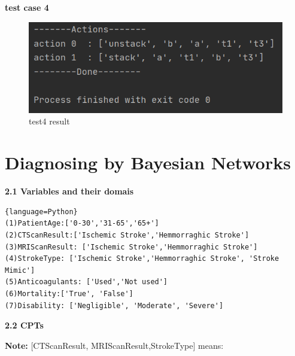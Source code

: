 \documentclass[a4paper, 11pt]{article}
\begin{document}
\begin{enumerate}
	\textbf{test case 4}
	\begin{figure}[H]
	\centering
	\includegraphics[width=1\textwidth]{Pic/test4.png}
	\caption{test4 result}
	\end{figure}
		
\end{enumerate}


\section{Diagnosing by Bayesian Networks}
\textbf{2.1 Variables and their domais}
\begin{lstlisting}{language=Python}
(1)PatientAge:['0-30','31-65','65+']
(2)CTScanResult:['Ischemic Stroke','Hemmorraghic Stroke']
(3)MRIScanResult: ['Ischemic Stroke','Hemmorraghic Stroke']
(4)StrokeType: ['Ischemic Stroke','Hemmorraghic Stroke', 'Stroke Mimic']
(5)Anticoagulants: ['Used','Not used']
(6)Mortality:['True', 'False']
(7)Disability: ['Negligible', 'Moderate', 'Severe']
\end{lstlisting}
\textbf{2.2 CPTs}

\textbf{Note:} [CTScanResult, MRIScanResult,StrokeType] means:
\end{document}
